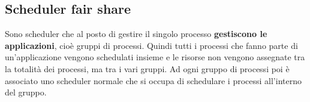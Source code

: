 \documentclass[a4paper]{article}
\begin{document}
\subsection{Scheduler fair share}
Sono scheduler che al posto di gestire il singolo processo 
\textbf{gestiscono le applicazioni}, cioè gruppi di processi. Quindi tutti i processi che
fanno parte di un'applicazione vengono schedulati insieme e le risorse non vengono 
assegnate tra la totalità dei processi, ma tra i vari gruppi. Ad ogni gruppo di processi
poi è associato uno scheduler normale che si occupa di schedulare i processi all'interno 
del gruppo.
\end{document}
